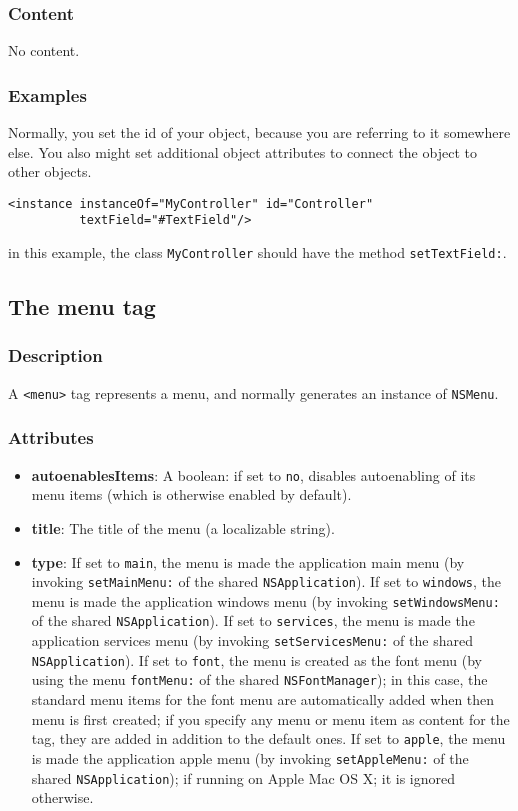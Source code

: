 \subsubsection{Content}
No content.

\subsubsection{Examples}
Normally, you set the id of your object, because you are referring to
it somewhere else.  You also might set additional object attributes to
connect the object to other objects.
\begin{verbatim}
<instance instanceOf="MyController" id="Controller" 
          textField="#TextField"/>
\end{verbatim}
in this example, the class \texttt{MyController} should have the method
\texttt{setTextField:}.

\subsection{The menu tag}

\subsubsection{Description}
A \texttt{<menu>} tag represents a menu, and normally generates an
instance of \texttt{NSMenu}.

\subsubsection{Attributes}
\begin{itemize}
\item {\bf autoenablesItems}: A boolean: if set to \texttt{no}, disables 
autoenabling of its menu items (which is otherwise enabled by default).
\item {\bf title}: The title of the menu (a localizable string).
\item {\bf type}: If set to \texttt{main}, the menu is made the
application main menu (by invoking \texttt{setMainMenu:} of the shared
\texttt{NSApplication}).  If set to \texttt{windows}, the menu is made
the application windows menu (by invoking \texttt{setWindowsMenu:} of
the shared \texttt{NSApplication}).  If set to \texttt{services}, the
menu is made the application services menu (by invoking
\texttt{setServicesMenu:} of the shared \texttt{NSApplication}).  If
set to \texttt{font}, the menu is created as the font menu (by using
the menu \texttt{fontMenu:} of the shared \texttt{NSFontManager}); in
this case, the standard menu items for the font menu are automatically
added when then menu is first created; if you specify any menu or menu
item as content for the tag, they are added in addition to the default
ones.  If set to \texttt{apple}, the menu is made the application
apple menu (by invoking \texttt{setAppleMenu:} of the shared
\texttt{NSApplication}); if running on Apple Mac OS X; it is ignored
otherwise.
\end{itemize}

